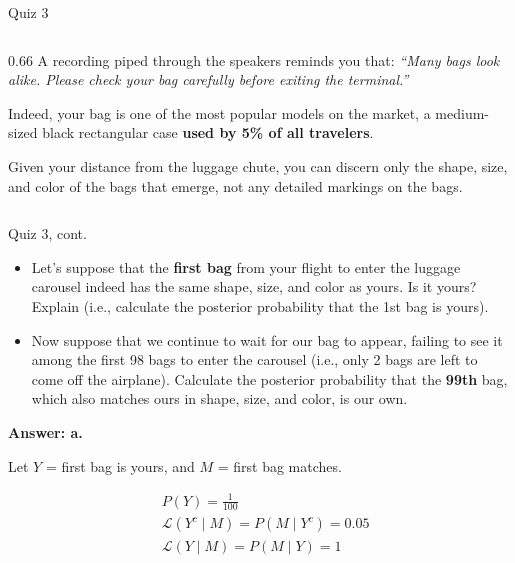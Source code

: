 \documentclass[12pt]{beamer}
\begin{document}
{\begin{frame}{}
\begin{block}{Quiz 3}
\begin{columns}[c]
\begin{column}{0.66\textwidth}
    A recording piped through the speakers reminds you that:
    \emph{``Many bags look alike. Please check your bag carefully before exiting the terminal.''}
    
    \vspace{0.2cm}
    
    Indeed, your bag is one of the most popular models on the market, a medium-sized black rectangular case \textbf{used by 5\% of all travelers}.
    
    \vspace{0.2cm}
    
    Given your distance from the luggage chute, you can discern only the shape, size, and color of the bags that emerge, not any detailed markings on the bags.
    \end{column}
\end{columns}
\end{block}
\end{frame}

\begin{frame}{}
\begin{block}{Quiz 3, cont.}
\begin{itemize}
\item[a.] Let's suppose that the \textbf{first bag} from your flight to enter the luggage carousel indeed has the same shape, size, and color as yours.
          Is it yours? Explain (i.e., calculate the posterior probability that the 1st bag is yours).

\vspace{0.4cm}
    
\item[b.] Now suppose that we continue to wait for our bag to appear, failing to see it among the first 98 bags to enter the carousel (i.e., only 2 bags are left to come off the airplane).
          Calculate the posterior probability that the \textbf{99th} bag, which also matches ours in shape, size, and color, is our own.
\end{itemize}
\end{block}
\end{frame}

\begin{frame}{}
\textbf{Answer: a.}
{\color{blue}
\footnotesize
Let \(Y\) = first bag is yours, and \(M\) = first bag matches.

\[
\begin{aligned}
&P(Y)=\frac{1}{100}\\
&\mathcal{L}(Y^c\mid M)=P(M\mid Y^c)=0.05\\
&\mathcal{L}(Y\mid M)=P(M\mid Y)=1\\
\end{aligned}
\]

}
\end{frame}}
\end{document}
